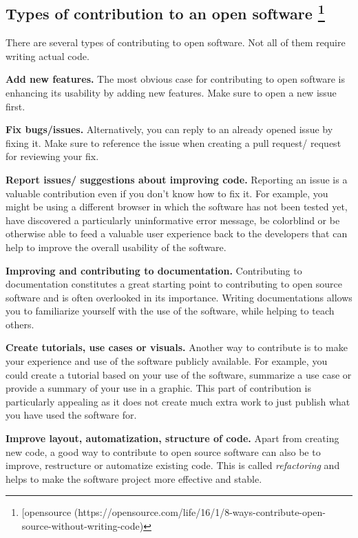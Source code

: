 \documentclass[
  letterpaper,
  DIV=11,
  numbers=noendperiod]{scrreport}
\begin{document}
\hypertarget{types-of-contribution-to-an-open-software-opensource}{%
\subsection[Types of contribution to an open software
]{\texorpdfstring{Types of contribution to an open software
\footnote{{[}opensource
  (https://opensource.com/life/16/1/8-ways-contribute-open-source-without-writing-code)}}{Types of contribution to an open software }}\label{types-of-contribution-to-an-open-software-opensource}}

There are several types of contributing to open software. Not all of
them require writing actual code.

\textbf{Add new features.} The most obvious case for contributing to
open software is enhancing its usability by adding new features. Make
sure to open a new issue first.

\textbf{Fix bugs/issues.} Alternatively, you can reply to an already
opened issue by fixing it. Make sure to reference the issue when
creating a pull request/ request for reviewing your fix.

\textbf{Report issues/ suggestions about improving code.} Reporting an
issue is a valuable contribution even if you don't know how to fix it.
For example, you might be using a different browser in which the
software has not been tested yet, have discovered a particularly
uninformative error message, be colorblind or be otherwise able to feed
a valuable user experience back to the developers that can help to
improve the overall usability of the software.

\textbf{Improving and contributing to documentation.} Contributing to
documentation constitutes a great starting point to contributing to open
source software and is often overlooked in its importance. Writing
documentations allows you to familiarize yourself with the use of the
software, while helping to teach others.

\textbf{Create tutorials, use cases or visuals.} Another way to
contribute is to make your experience and use of the software publicly
available. For example, you could create a tutorial based on your use of
the software, summarize a use case or provide a summary of your use in a
graphic. This part of contribution is particularly appealing as it does
not create much extra work to just publish what you have used the
software for.

\textbf{Improve layout, automatization, structure of code.} Apart from
creating new code, a good way to contribute to open source software can
also be to improve, restructure or automatize existing code. This is
called \emph{refactoring} and helps to make the software project more
effective and stable.
\end{document}
